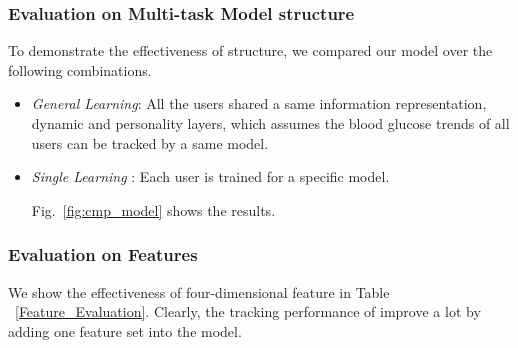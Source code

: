 \subsubsection{Evaluation on Multi-task Model structure}
To demonstrate the effectiveness of \modelname structure, we compared our model over the following combinations.

\begin{itemize}

  \item \emph{General Learning}:
  All the users shared a same information representation, dynamic and personality layers, which assumes the blood glucose trends of all users can be tracked by a same model.


  \item \emph{Single Learning }:
  Each user is trained for a specific model.

  Fig.~\ref{fig:cmp_model} shows the results.
\end{itemize}

\subsubsection{Evaluation on Features}

We show the effectiveness of four-dimensional feature in Table ~\ref{Feature_Evaluation}. Clearly, the tracking performance of \sysname improve a lot by adding one feature set into the model.



